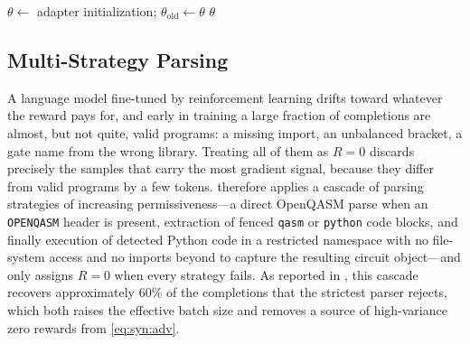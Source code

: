 \begin{algorithm}[htbp]
\caption{\rubriq{} rubric-guided GRPO fine-tuning.}
\label{alg:syn:rubriq}
$\theta\leftarrow$ adapter initialization; $\theta_{\mathrm{old}}\leftarrow\theta$\;
\Return $\theta$\;
\end{algorithm}

\subsection{Multi-Strategy Parsing}\label{sec:syn:parsing}

A language model fine-tuned by reinforcement learning drifts toward whatever the reward pays for, and early in training a large fraction of completions are almost, but not quite, valid programs: a missing import, an unbalanced bracket, a gate name from the wrong library. Treating all of them as $R=0$ discards precisely the samples that carry the most gradient signal, because they differ from valid programs by a few tokens. \rubriq{} therefore applies a cascade of parsing strategies of increasing permissiveness---a direct OpenQASM parse when an \texttt{OPENQASM} header is present, extraction of fenced \texttt{qasm} or \texttt{python} code blocks, and finally execution of detected \qiskit{} Python code in a restricted namespace with no file-system access and no imports beyond \qiskit{} to capture the resulting circuit object---and only assigns $R=0$ when every strategy fails. As reported in \cite{guo2026rubriq}, this cascade recovers approximately $60\%$ of the completions that the strictest parser rejects, which both raises the effective batch size and removes a source of high-variance zero rewards from \cref{eq:syn:adv}.

